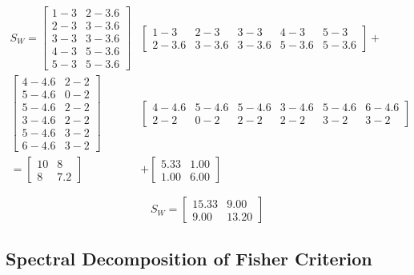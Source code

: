 \documentclass[12pt]{article}
\begin{document}
\begin{align}
    S_W = \begin{bmatrix}
        1 - 3 & 2 - 3.6 \\
        2 - 3 & 3 - 3.6 \\
        3 - 3 & 3 - 3.6 \\
        4 - 3 & 5 - 3.6 \\
        5 - 3 & 5 - 3.6
    \end{bmatrix}
    &\begin{bmatrix}
        1 -3 & 2 - 3 & 3 - 3 & 4 - 3 & 5 - 3 \\
        2 - 3.6 & 3 - 3.6 & 3 - 3.6 & 5 - 3.6 & 5 - 3.6
    \end{bmatrix}
    + \\
    \begin{bmatrix}
        4 - 4.6 & 2 - 2 \\
        5 - 4.6 & 0 - 2 \\
        5 - 4.6 & 2 - 2 \\
        3 - 4.6 & 2 - 2 \\
        5 - 4.6 & 3 - 2 \\
        6 - 4.6 & 3 - 2
    \end{bmatrix}
    &\begin{bmatrix}
        4 - 4.6 & 5 - 4.6 & 5 - 4.6 & 3 - 4.6 & 5 - 4.6 & 6 - 4.6 \\
        2 - 2 & 0 - 2 & 2 - 2 & 2 - 2 & 3 - 2 & 3 - 2
    \end{bmatrix} \\
    =
    \begin{bmatrix}
         10 & 8 \\
         8 & 7.2
    \end{bmatrix}
    &+
    \begin{bmatrix}
        5.33 & 1.00 \\
        1.00 & 6.00
    \end{bmatrix}
\end{align}

\begin{equation}
    S_W = 
    \boxed{
        \begin{bmatrix}
            15.33 & 9.00 \\
            9.00 & 13.20
        \end{bmatrix}
    }
\end{equation}

\subsection{Spectral Decomposition of Fisher Criterion}
\end{document}
